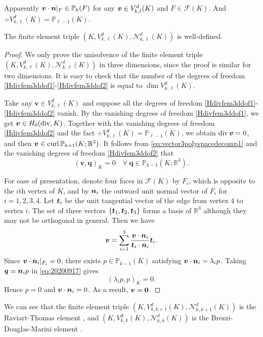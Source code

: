 Apparently $\boldsymbol v\cdot \boldsymbol n|_F\in\mathbb P_{k}(F)$ for any $\boldsymbol v\in V_{k,\ell}^d(K)$ and $F\in\mathcal F(K)$.
And $\div V_{k,\ell}^d(K)=\mathbb P_{\ell-1}(K)$.




\begin{lemma}\label{lem:unisovlenHdivfem}
The finite element triple $(K, V_{k,\ell}^d(K), \mathcal N_{k,\ell}^d(K))$ is well-defined.
\end{lemma}
\begin{proof}
We only prove the unisolvence of the finite element triple $(K, V_{k,\ell}^d(K), \mathcal N_{k,\ell}^d(K))$ in three dimensions, since the proof is similar for two dimensions. It is easy to check that the number of the degrees of freedom \eqref{Hdivfem3ddof1}-\eqref{Hdivfem3ddof2}  is equal to $\dim V_{k,\ell}^d(K)$.


Take any $\boldsymbol v\in V_{k,\ell}^d(K)$ and
suppose all the degrees of freedom \eqref{Hdivfem3ddof1}-\eqref{Hdivfem3ddof2} vanish. 
By the vanishing degrees of freedom \eqref{Hdivfem3ddof1}, we get $\boldsymbol v\in H_0(\operatorname{div}, K)$. 
Together with the vanishing degrees of freedom \eqref{Hdivfem3ddof2} and the fact $\div V_{k,\ell}^d(K)=\mathbb P_{\ell-1}(K)$, we obtain $\operatorname{div}\boldsymbol v=0$, and then $\boldsymbol v\in\operatorname{curl}\mathbb P_{k+1}(K;\mathbb R^3)$.
It follows from \eqref{eq:vector3polyspacedecomp1} and the vanishing degrees of freedom \eqref{Hdivfem3ddof2} that 
\begin{equation}\label{eq:20200917}
(\boldsymbol v, \boldsymbol q)_K =0 \quad\forall~\boldsymbol q\in\mathbb P_{k-1}(K; \mathbb R^3). 
\end{equation}

For ease of presentation, denote four faces in $\mathcal F(K)$ by $F_i$, which is opposite to the $i$th vertex of $K$, and by $\boldsymbol n_i$ the outward unit normal vector of $F_i$ for $i=1,2,3,4$. 
Let $\boldsymbol t_i$ be the unit tangential vector of the edge from vertex $4$ to vertex $i$. 
The set of three vectors $\{\boldsymbol t_1, \boldsymbol t_2, \boldsymbol t_3\}$ forms a basis of $\mathbb R^3$ although they may not be orthogonal in general. Then we have
\[
\boldsymbol v=\sum_{i=1}^3\frac{\boldsymbol v\cdot\boldsymbol n_i}{\boldsymbol t_i\cdot\boldsymbol n_i}\boldsymbol t_i.
\]
Since $\boldsymbol v\cdot\boldsymbol n_i|_{F_i}=0$, there exists $p\in\mathbb P_{k-1}(K)$ satisfying $\boldsymbol v\cdot\boldsymbol n_i=\lambda_ip$. Taking $\boldsymbol q=\boldsymbol n_ip$ in \eqref{eq:20200917} gives
\[
(\lambda_ip, p)_K =0.
\]
Hence $p=0$ and $\boldsymbol v\cdot\boldsymbol n_i=0$. As a result, $\boldsymbol v=\boldsymbol 0$.
\end{proof}

We can see that the finite element triple $(K, V_{k,k+1}^d(K), \mathcal N_{k,k+1}^d(K))$ is the Raviart-Thomas element \cite{RaviartThomas1977,Nedelec1980}, and $(K, V_{k,k}^d(K), \mathcal N_{k,k}^d(K))$ is the Brezzi-Douglas-Marini element \cite{BrezziDouglasMarini1986,BrezziDouglasDuranFortin1987}.

